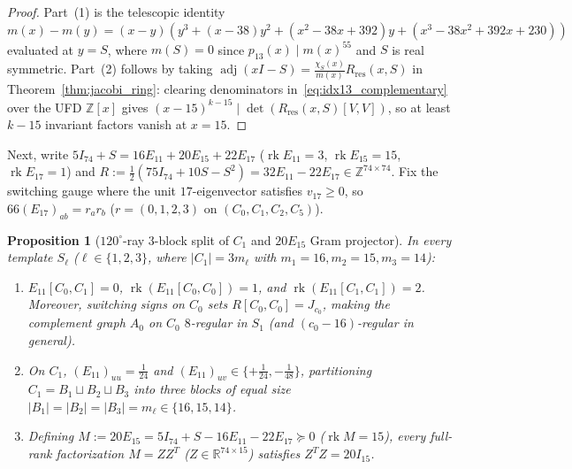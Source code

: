 \documentclass[11pt,reqno]{amsart}
\newtheorem{proposition}[theorem]{Proposition}
\theoremstyle{definition}
\theoremstyle{remark}
\numberwithin{equation}{section}
\numberwithin{table}{section}
\DeclareMathOperator{\rk}{rk}
\DeclareMathOperator{\adj}{adj}
\begin{document}
\begin{proof}
Part~(1) is the telescopic identity $m(x) - m(y) = (x - y)(y^3 + (x-38)y^2 + (x^2-38x+392)y + (x^3-38x^2+392x+230))$ evaluated at $y = S$, where $m(S) = 0$ since $p_{13}(x) \mid m(x)^{55}$ and $S$ is real symmetric. Part~(2) follows by taking $\adj(xI - S) = \frac{\chi_S(x)}{m(x)} R_{\mathrm{res}}(x, S)$ in Theorem~\ref{thm:jacobi_ring}: clearing denominators in~\eqref{eq:idx13_complementary} over the UFD $\mathbb{Z}[x]$ gives $(x - 15)^{k - 15} \mid \det(R_{\mathrm{res}}(x, S)[V, V])$, so at least $k - 15$ invariant factors vanish at $x = 15$.
\end{proof}

Next, write $5I_{74} + S = 16 E_{11} + 20 E_{15} + 22 E_{17}$ ($\rk E_{11} = 3$, $\rk E_{15} = 15$, $\rk E_{17} = 1$) and $R := \frac{1}{2}(75I_{74} + 10S - S^2) = 32 E_{11} - 22 E_{17} \in \mathbb{Z}^{74 \times 74}$. Fix the switching gauge where the unit $17$-eigenvector satisfies $v_{17} \ge 0$, so $66(E_{17})_{ab} = r_a r_b$ ($r = (0, 1, 2, 3)$ on $(C_0, C_1, C_2, C_5)$).

\begin{proposition}[$120^\circ$-ray $3$-block split of $C_1$ and $20E_{15}$ Gram projector]\label{prop:alg84}
In every template $S_\ell$ ($\ell \in \{1, 2, 3\}$, where $|C_1| = 3m_\ell$ with $m_1 = 16, m_2 = 15, m_3 = 14$):
\begin{enumerate}
  \item $E_{11}[C_0, C_1] = 0$, $\rk(E_{11}[C_0, C_0]) = 1$, and $\rk(E_{11}[C_1, C_1]) = 2$. Moreover, switching signs on $C_0$ sets $R[C_0, C_0] = J_{c_0}$, making the complement graph $A_0$ on $C_0$ $8$-regular in $S_1$ (and $(c_0 - 16)$-regular in general).
  \item On $C_1$, $(E_{11})_{uu} = \frac{1}{24}$ and $(E_{11})_{uv} \in \{+\frac{1}{24}, -\frac{1}{48}\}$, partitioning $C_1 = B_1 \sqcup B_2 \sqcup B_3$ into three blocks of equal size $|B_1| = |B_2| = |B_3| = m_\ell \in \{16, 15, 14\}$.
  \item Defining $M := 20 E_{15} = 5I_{74} + S - 16 E_{11} - 22 E_{17} \succeq 0$ ($\rk M = 15$), every full-rank factorization $M = Z Z^T$ ($Z \in \mathbb{R}^{74 \times 15}$) satisfies $Z^T Z = 20 I_{15}$.
\end{enumerate}
\end{proposition}
\end{document}
